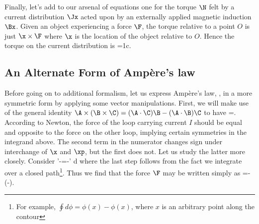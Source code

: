 Finally, let's add to our arsenal of equations one for the torque $\N$
felt by a current distribution $\Jx$ acted upon by an externally applied
magnetic induction $\Bx$. Given an object experiencing a force
$\F$, the torque relative to a point $O$ is just $\x\times\F$ where $\x$ is
the location of the object relative to $O$. Hence the torque on the current
distribution is
\beq
\N=\frac1c\iniv[\x\times(\Jx\times\Bx)].
\eeq

\subsection{An Alternate Form of Amp\`ere's law}

Before going on to additional formalism, let us express Amp\`ere's law,
, in a more symmetric form by applying some vector manipulations.
First, we will make use of the general identity $\A\times(\B\times\C)=
(\A\cdot\C)\B-(\A\cdot\B)\C$ to have
\beq
\F=\int\int{}.
\eeq
According to Newton, the force of the loop carrying current $I$ should be
equal and opposite to the force on the other loop, implying certain
symmetries in the integrand above. The second term in the numerator changes
sign under interchange of $\x$ and $\xp$, but the first does not. Let us
study the latter more closely. Consider
\beq
\int \dvl'\int\dvl\cdot\leb-\grad\lep{}\xxpa\rip\rib=-\int\dvl'\int
d\lep{}\xxpa\rip{}
\eeq
where the last step follows from the fact we integrate over a 
closed path\footnote{For example, $\oint d\phi = \phi(x)-\phi(x)$, where $x$
is an arbitrary point along the contour}.
Thus we find that the force $\F$ may be written simply as
\beq
\F=-\int\int{}(\x-\xp).
\eeq

